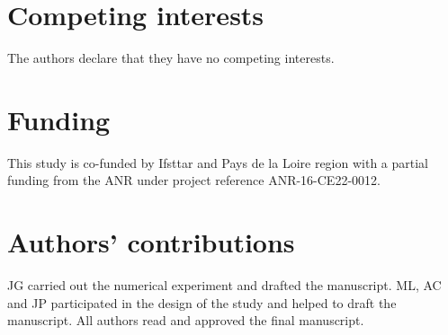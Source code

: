 \documentclass[twocolumn]{svjour3}          %
\begin{document}
\section*{Competing interests}
The authors declare that they have no competing interests.

\section*{Funding}
This study is co-funded by Ifsttar and Pays de la Loire region with a partial funding from the ANR under project reference ANR-16-CE22-0012.

\section*{Authors' contributions}
JG carried out the numerical experiment and drafted the manuscript. ML, AC and JP participated in the design of the study and helped to draft the manuscript.
All authors read and approved the final manuscript.


\end{document}
